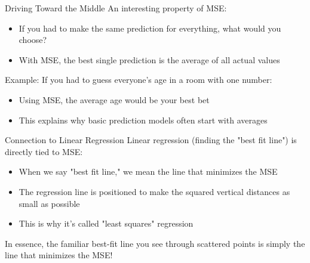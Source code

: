 \documentclass{beamer}
\begin{document}
\begin{frame}{Driving Toward the Middle}
  An interesting property of MSE:
  
  \begin{itemize}
    \item If you had to make the same prediction for everything, what would you choose?
    \item With MSE, the best single prediction is the average of all actual values
  \end{itemize}
  
  \vspace{0.5cm}
  
  Example: If you had to guess everyone's age in a room with one number:
  \begin{itemize}
    \item Using MSE, the average age would be your best bet
    \item This explains why basic prediction models often start with averages
  \end{itemize}
\end{frame}

\begin{frame}{Connection to Linear Regression}
  Linear regression (finding the "best fit line") is directly tied to MSE:
  
  \begin{itemize}
    \item When we say "best fit line," we mean the line that minimizes the MSE
    \item The regression line is positioned to make the squared vertical distances as small as possible
    \item This is why it's called "least squares" regression
  \end{itemize}
  
  \vspace{0.5cm}
  
  In essence, the familiar best-fit line you see through scattered points is simply the line that minimizes the MSE!
\end{frame}
\end{document}
